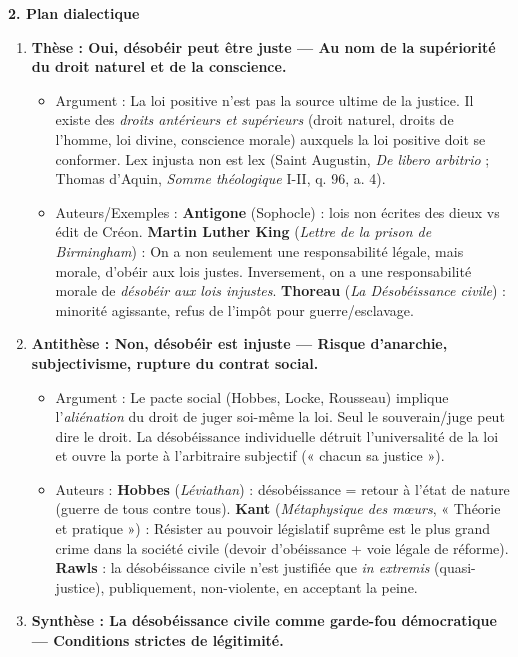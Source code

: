 \documentclass[11pt]{article}
\begin{document}
\begin{corrige}
\textbf{2. Plan dialectique}
\begin{enumerate}
    \item \textbf{Thèse : Oui, désobéir peut être juste — Au nom de la supériorité du droit naturel et de la conscience.}
    \begin{itemize}
        \item Argument : La loi positive n'est pas la source ultime de la justice. Il existe des \emph{droits antérieurs et supérieurs} (droit naturel, droits de l'homme, loi divine, conscience morale) auxquels la loi positive doit se conformer. \guillemotleft Lex injusta non est lex \guillemotright (Saint Augustin, \emph{De libero arbitrio} ; Thomas d'Aquin, \emph{Somme théologique} I-II, q. 96, a. 4).
        \item Auteurs/Exemples : \textbf{Antigone} (Sophocle) : lois non écrites des dieux vs édit de Créon. \textbf{Martin Luther King} (\emph{Lettre de la prison de Birmingham}) : \guillemotleft On a non seulement une responsabilité légale, mais morale, d'obéir aux lois justes. Inversement, on a une responsabilité morale de \emph{désobéir aux lois injustes}. \guillemotright \textbf{Thoreau} (\emph{La Désobéissance civile}) : minorité agissante, refus de l'impôt pour guerre/esclavage.
    \end{itemize}
    \item \textbf{Antithèse : Non, désobéir est injuste — Risque d'anarchie, subjectivisme, rupture du contrat social.}
    \begin{itemize}
        \item Argument : Le pacte social (Hobbes, Locke, Rousseau) implique l'\emph{aliénation} du droit de juger soi-même la loi. Seul le souverain/juge peut dire le droit. La désobéissance individuelle détruit l'universalité de la loi et ouvre la porte à l'arbitraire subjectif (« chacun sa justice »).
        \item Auteurs : \textbf{Hobbes} (\emph{Léviathan}) : désobéissance = retour à l'état de nature (guerre de tous contre tous). \textbf{Kant} (\emph{Métaphysique des mœurs}, « Théorie et pratique ») : \guillemotleft Résister au pouvoir législatif suprême est le plus grand crime dans la société civile \guillemotright (devoir d'obéissance + voie légale de réforme). \textbf{Rawls} : la désobéissance civile n'est justifiée que \emph{in extremis} (quasi-justice), publiquement, non-violente, en acceptant la peine.
    \end{itemize}
    \item \textbf{Synthèse : La désobéissance civile comme garde-fou démocratique — Conditions strictes de légitimité.}

\end{enumerate}
\end{corrige}
\end{document}
